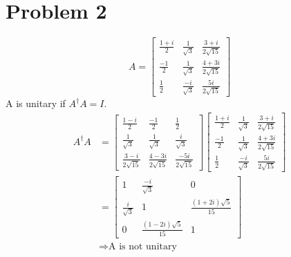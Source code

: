 \documentclass[12pt]{article}
\begin{document}
\section*{Problem 2}
\[A = \begin{bmatrix}
    \frac{1+i}{2} & \frac{1}{\sqrt{3}} & \frac{3+i}{2\sqrt{15}} \\
    \frac{-1}{2} & \frac{1}{\sqrt{3}} & \frac{4 + 3i}{2\sqrt{15}} \\
    \frac{1}{2} & \frac{-i}{\sqrt{3}} & \frac{5i}{2\sqrt{15}}
\end{bmatrix}\]
A is unitary if \(A^{\dagger}A = I\).
\begin{align*}
    A^{\dagger}A &= \begin{bmatrix}
        \frac{1-i}{2} & \frac{-1}{2} & \frac{1}{2} \\
        \frac{1}{\sqrt{3}} & \frac{1}{\sqrt{3}} & \frac{i}{\sqrt{3}} \\
        \frac{3-i}{2\sqrt{15}} & \frac{4-3i}{2\sqrt{15}} & \frac{-5i}{2\sqrt{15}}
    \end{bmatrix} \begin{bmatrix}
        \frac{1+i}{2} & \frac{1}{\sqrt{3}} & \frac{3+i}{2\sqrt{15}} \\
        \frac{-1}{2} & \frac{1}{\sqrt{3}} & \frac{4 + 3i}{2\sqrt{15}} \\
        \frac{1}{2} & \frac{-i}{\sqrt{3}} & \frac{5i}{2\sqrt{15}}
    \end{bmatrix} \\
    &=  \begin{bmatrix}
        1 & \frac{-i}{\sqrt{3}} & 0 \\
        \frac{i}{\sqrt{3}} & 1 & \frac{(1+2i)\sqrt{5}}{15} \\
        0 & \frac{(1-2i)\sqrt{5}}{15} & 1
    \end{bmatrix}\\
    & \Rightarrow \text{A is not unitary}
\end{align*}
\end{document}
